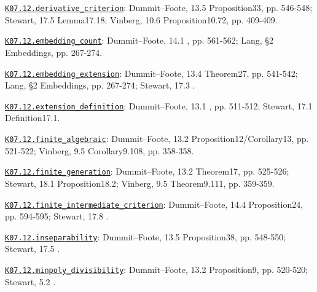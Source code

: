 \par\smallskip\noindent\hypertarget{src:K07.12.derivative_criterion}{}\label{src:K07.12.derivative_criterion}\hyperref[K07.12.derivative_criterion]{\texttt{K07.12.derivative\_criterion}}: Dummit--Foote, 13.5 Proposition33, pp. 546-548; Stewart, 17.5 Lemma17.18; Vinberg, 10.6 Proposition10.72, pp. 409-409.
\par\smallskip\noindent\hypertarget{src:K07.12.embedding_count}{}\label{src:K07.12.embedding_count}\hyperref[K07.12.embedding_count]{\texttt{K07.12.embedding\_count}}: Dummit--Foote, 14.1 , pp. 561-562; Lang, §2 Embeddings, pp. 267-274.
\par\smallskip\noindent\hypertarget{src:K07.12.embedding_extension}{}\label{src:K07.12.embedding_extension}\hyperref[K07.12.embedding_extension]{\texttt{K07.12.embedding\_extension}}: Dummit--Foote, 13.4 Theorem27, pp. 541-542; Lang, §2 Embeddings, pp. 267-274; Stewart, 17.3 .
\par\smallskip\noindent\hypertarget{src:K07.12.extension_definition}{}\label{src:K07.12.extension_definition}\hyperref[K07.12.extension_definition]{\texttt{K07.12.extension\_definition}}: Dummit--Foote, 13.1 , pp. 511-512; Stewart, 17.1 Definition17.1.
\par\smallskip\noindent\hypertarget{src:K07.12.finite_algebraic}{}\label{src:K07.12.finite_algebraic}\hyperref[K07.12.finite_algebraic]{\texttt{K07.12.finite\_algebraic}}: Dummit--Foote, 13.2 Proposition12/Corollary13, pp. 521-522; Vinberg, 9.5 Corollary9.108, pp. 358-358.
\par\smallskip\noindent\hypertarget{src:K07.12.finite_generation}{}\label{src:K07.12.finite_generation}\hyperref[K07.12.finite_generation]{\texttt{K07.12.finite\_generation}}: Dummit--Foote, 13.2 Theorem17, pp. 525-526; Stewart, 18.1 Proposition18.2; Vinberg, 9.5 Theorem9.111, pp. 359-359.
\par\smallskip\noindent\hypertarget{src:K07.12.finite_intermediate_criterion}{}\label{src:K07.12.finite_intermediate_criterion}\hyperref[K07.12.finite_intermediate_criterion]{\texttt{K07.12.finite\_intermediate\_criterion}}: Dummit--Foote, 14.4 Proposition24, pp. 594-595; Stewart, 17.8 .
\par\smallskip\noindent\hypertarget{src:K07.12.inseparability}{}\label{src:K07.12.inseparability}\hyperref[K07.12.inseparability]{\texttt{K07.12.inseparability}}: Dummit--Foote, 13.5 Proposition38, pp. 548-550; Stewart, 17.5 .
\par\smallskip\noindent\hypertarget{src:K07.12.minpoly_divisibility}{}\label{src:K07.12.minpoly_divisibility}\hyperref[K07.12.minpoly_divisibility]{\texttt{K07.12.minpoly\_divisibility}}: Dummit--Foote, 13.2 Proposition9, pp. 520-520; Stewart, 5.2 .
